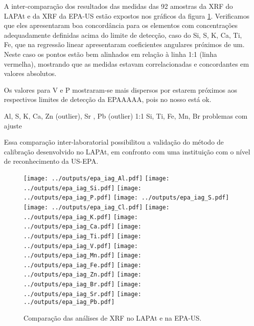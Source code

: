 A inter-comparação dos resultados das medidas das 92 amostras da XRF do LAPAt e 
da XRF da EPA-US estão expostos nos gráficos da figura \ref{fig:epa_lapat}. 
Verificamos que eles apresentaram boa concordância para os elementos com 
concentrações adequadamente definidas acima do limite de detecção, caso do Si, 
S, K, Ca, Ti, Fe, que na regressão linear apresentaram coeficientes angulares 
próximos de um. Neste caso os pontos estão bem alinhados em relação à 
linha 1:1 (linha vermelha), mostrando que as medidas estavam correlacionadas e 
concordantes em valores absolutos.

Os valores para V e P mostraram-se mais dispersos por estarem próximos aos 
respectivos limites de detecção da EPAAAAA, pois no nosso está ok.

Al, S, K, Ca, Zn (outlier), Sr , Pb (outlier) 1:1
Si, Ti, Fe, Mn, Br  problemas com ajuste
 
Essa comparação inter-laboratorial possibilitou a validação do método de 
calibração desenvolvido no LAPAt, em confronto com uma instituição com o nível 
de reconhecimento da US-EPA.

\newpage
\begin{figure}[H]
  \centering
    \texttt{[image: ../outputs/epa\_iag\_Al.pdf]}
    \texttt{[image: ../outputs/epa\_iag\_Si.pdf]}
    \texttt{[image: ../outputs/epa\_iag\_P.pdf]}
    \texttt{[image: ../outputs/epa\_iag\_S.pdf]}
    \texttt{[image: ../outputs/epa\_iag\_Cl.pdf]}
    \texttt{[image: ../outputs/epa\_iag\_K.pdf]}
    \texttt{[image: ../outputs/epa\_iag\_Ca.pdf]}
    \texttt{[image: ../outputs/epa\_iag\_Ti.pdf]}
    \texttt{[image: ../outputs/epa\_iag\_V.pdf]}
    \texttt{[image: ../outputs/epa\_iag\_Mn.pdf]}
    \texttt{[image: ../outputs/epa\_iag\_Fe.pdf]}
    \texttt{[image: ../outputs/epa\_iag\_Zn.pdf]}
    \texttt{[image: ../outputs/epa\_iag\_Br.pdf]}
    \texttt{[image: ../outputs/epa\_iag\_Sr.pdf]}
    \texttt{[image: ../outputs/epa\_iag\_Pb.pdf]}
  \caption{Comparação das análises de XRF no LAPAt e na EPA-US. 
           \label{fig:epa_lapat}}
\end{figure}
